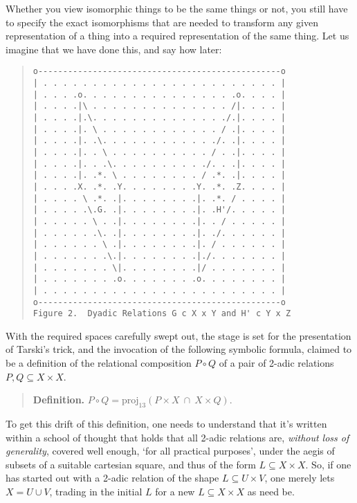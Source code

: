 \documentclass[12pt]{article}
\begin{document}
Whether you view isomorphic things to be the same things or not, you still have to specify the exact isomorphisms that are needed to transform any given representation of a thing into a required representation of the same thing.  Let us imagine that we have done this, and say how later:

\begin{quote}\begin{verbatim}
o-------------------------------------------------o
| . . . . . . . . . . . . . . . . . . . . . . . . |
| . . . .o. . . . . . . . . . . . . . . .o. . . . |
| . . . .|\ . . . . . . . . . . . . . . /|. . . . |
| . . . .|.\. . . . . . . . . . . . . ./.|. . . . |
| . . . .|. \ . . . . . . . . . . . . / .|. . . . |
| . . . .|. .\. . . . . . . . . . . ./. .|. . . . |
| . . . .|. . \ . . . . . . . . . . / . .|. . . . |
| . . . .|. . .\. . . . . . . . . ./. . .|. . . . |
| . . . .|. .*. \ . . . . . . . . / .*. .|. . . . |
| . . . .X. .*. .Y. . . . . . . .Y. .*. .Z. . . . |
| . . . . \ .*. .|. . . . . . . .|. .*. / . . . . |
| . . . . .\.G. .|. . . . . . . .|. .H'/. . . . . |
| . . . . . \ . .|. . . . . . . .|. . / . . . . . |
| . . . . . .\. .|. . . . . . . .|. ./. . . . . . |
| . . . . . . \ .|. . . . . . . .|. / . . . . . . |
| . . . . . . .\.|. . . . . . . .|./. . . . . . . |
| . . . . . . . \|. . . . . . . .|/ . . . . . . . |
| . . . . . . . .o. . . . . . . .o. . . . . . . . |
| . . . . . . . . . . . . . . . . . . . . . . . . |
o-------------------------------------------------o
Figure 2.  Dyadic Relations G c X x Y and H' c Y x Z
\end{verbatim}\end{quote}

With the required spaces carefully swept out, the stage is set for the presentation of Tarski's trick, and the invocation of the following symbolic formula, claimed to be a definition of the relational composition $P \circ Q$ of a pair of 2-adic relations $P, Q \subseteq X \times X$.

\begin{quote}
\textbf{Definition.}  $P \circ Q = \mathrm{proj}_{13}(P \times X\ \cap\ X \times Q).$
\end{quote}

To get this drift of this definition, one needs to understand that it's written within a school of thought that holds that all 2-adic relations are, \textit{without loss of generality}, covered well enough, `for all practical purposes', under the aegis of subsets of a suitable cartesian square, and thus of the form $L \subseteq X \times X$.  So, if one has started out with a 2-adic relation of the shape $L \subseteq U \times V$, one merely lets $X = U \cup V$, trading in the initial $L$ for a new $L \subseteq X \times X$ as need be.
\end{document}
